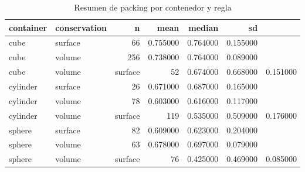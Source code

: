 \begin{table}
\caption{Resumen de packing por contenedor y regla}
\label{tab:summary_packing}
\begin{tabular}{llrrrr}
\toprule
container & conservation & n & mean & median & sd \\
\midrule
cube & surface & 66 & 0.755000 & 0.764000 & 0.155000 \\
cube & volume & 256 & 0.738000 & 0.764000 & 0.089000 \\
cube & volume & surface & 52 & 0.674000 & 0.668000 & 0.151000 \\
cylinder & surface & 26 & 0.671000 & 0.687000 & 0.165000 \\
cylinder & volume & 78 & 0.603000 & 0.616000 & 0.117000 \\
cylinder & volume & surface & 119 & 0.535000 & 0.509000 & 0.176000 \\
sphere & surface & 82 & 0.609000 & 0.623000 & 0.204000 \\
sphere & volume & 63 & 0.678000 & 0.697000 & 0.079000 \\
sphere & volume & surface & 76 & 0.425000 & 0.469000 & 0.085000 \\
\bottomrule
\end{tabular}
\end{table}

